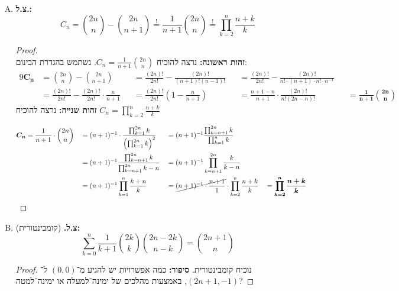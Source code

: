 \documentclass[]{article}
\newcommand\seq   {\overset{!}{=}}
\newcommand\sumnk     {\sum_{k = 0}^{n}}
\newcommand\cl [1]    {\left ( #1 \right )}
\begin{document}
	\section{} %
	\begin{enumerate}[(A)]
		\item \textbf{צ.ל.: }
		\[ C_n = \binom{2n}{n} - \binom{2n}{n + 1} \seq \frac{1}{n + 1} \binom{2n}{n} \seq \prod_{k = 2}^{n}\frac{n + k}{k} \]
		\begin{proof} \ \\
			\textbf{זהות ראשונה: }נרצה להוכיח $C_n = \frac{1}{n + 1}\binom{2n}{n}$. נשתמש בהגדרת הבינום: 
			\begin{alignat*}{9}
		   \bm{C_n} &= \binom{2n}{n} - \binom{2n}{n + 1} &&= \frac{(2n)!}{2n!} - \frac{(2n)!}{(n + 1)!(n - 1)!} &&= \frac{(2n)!}{2n!} - \frac{(2n)!}{n! \cdot (n + 1) \cdot n! \cdot n^{-1}}  \\
				    &= \frac{(2n)!}{2n!} - \frac{(2n)!}{2n!} \cdot \frac{n}{n + 1} &&= \frac{(2n)!}{2n!}\cl{1 - \frac{n}{n + 1}} &&= \frac{n + 1 - n}{n + 1} \cdot \frac{(2n)!}{n!(2n  - n)!} &&= \bm{\frac{1}{n + 1}\binom{2n}{n}}
			\end{alignat*}
			\textbf{זהות שנייה: }נרצה להוכיח $C_n = \prod_{k = 2}^{n} \frac{n + k}{k}$
			
			\begin{alignat*}{9}
		   \bm{C_n} &= \frac{1}{n + 1} \cdot \binom{2n}{n} &&= (n + 1)^{-1} \cdot \frac{\prod_{k = 1}^{2n} k}{\cl{\prod_{k = 1}^{2n} k}^2} &&= (n + 1)^{-1} \frac{\prod_{k = n + 1}^{2n} k }{\prod_{k = 1}^{n}k} \\
				  &&&= (n + 1)^{-1} \frac{\prod_{k = n + 1}^{2n} k }{\prod_{k = n + 1}^{2n} k - n} &&= (n + 1)^{-1} \prod_{k = n + 1}^{2n} \frac{k}{k - n} \\
				  &&&= (n + 1)^{-1} \prod_{k = 1}^{n} \frac{k + n}{k} &&= \cancel{(n + 1)^{-1} \cdot \frac{n + 1}{1}} \cdot \prod_{k = 2}^{n} \frac{n + k}{k} &&= \bm{\prod_{k = 2}^{n} \frac{n + k}{k}}
			\end{alignat*}
			
		\end{proof}
		\item \textbf{צ.ל. }(קומבינטורית)\textbf{: }
		\[ \sumnk \frac{1}{k + 1}\binom{2k}{k} \binom{2n - 2k}{n - k} = \binom{2n + 1}{n} \]
		\begin{proof} נוכיח קומבינטורית. 
			\textbf{סיפור: }כמה אפשרויות יש להגיע מ־$(0, 0)$ ל־$(2n + 1, -1)$, באמצעות מהלכים של ימינה־למעלה או ימינה־למטה?
			

\end{proof}
\end{enumerate}
\end{document}
